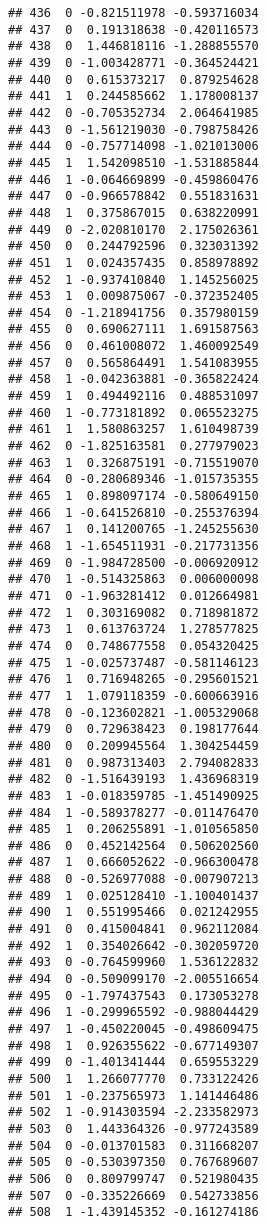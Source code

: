 \documentclass[
]{article}
\begin{document}
\begin{verbatim}
## 436  0 -0.821511978 -0.593716034
## 437  0  0.191318638 -0.420116573
## 438  0  1.446818116 -1.288855570
## 439  0 -1.003428771 -0.364524421
## 440  0  0.615373217  0.879254628
## 441  1  0.244585662  1.178008137
## 442  0 -0.705352734  2.064641985
## 443  0 -1.561219030 -0.798758426
## 444  0 -0.757714098 -1.021013006
## 445  1  1.542098510 -1.531885844
## 446  1 -0.064669899 -0.459860476
## 447  0 -0.966578842  0.551831631
## 448  1  0.375867015  0.638220991
## 449  0 -2.020810170  2.175026361
## 450  0  0.244792596  0.323031392
## 451  1  0.024357435  0.858978892
## 452  1 -0.937410840  1.145256025
## 453  1  0.009875067 -0.372352405
## 454  0 -1.218941756  0.357980159
## 455  0  0.690627111  1.691587563
## 456  0  0.461008072  1.460092549
## 457  0  0.565864491  1.541083955
## 458  1 -0.042363881 -0.365822424
## 459  1  0.494492116  0.488531097
## 460  1 -0.773181892  0.065523275
## 461  1  1.580863257  1.610498739
## 462  0 -1.825163581  0.277979023
## 463  1  0.326875191 -0.715519070
## 464  0 -0.280689346 -1.015735355
## 465  1  0.898097174 -0.580649150
## 466  1 -0.641526810 -0.255376394
## 467  1  0.141200765 -1.245255630
## 468  1 -1.654511931 -0.217731356
## 469  0 -1.984728500 -0.006920912
## 470  1 -0.514325863  0.006000098
## 471  0 -1.963281412  0.012664981
## 472  1  0.303169082  0.718981872
## 473  1  0.613763724  1.278577825
## 474  0  0.748677558  0.054320425
## 475  1 -0.025737487 -0.581146123
## 476  1  0.716948265 -0.295601521
## 477  1  1.079118359 -0.600663916
## 478  0 -0.123602821 -1.005329068
## 479  0  0.729638423  0.198177644
## 480  0  0.209945564  1.304254459
## 481  0  0.987313403  2.794082833
## 482  0 -1.516439193  1.436968319
## 483  1 -0.018359785 -1.451490925
## 484  1 -0.589378277 -0.011476470
## 485  1  0.206255891 -1.010565850
## 486  0  0.452142564  0.506202560
## 487  1  0.666052622 -0.966300478
## 488  0 -0.526977088 -0.007907213
## 489  1  0.025128410 -1.100401437
## 490  1  0.551995466  0.021242955
## 491  0  0.415004841  0.962112084
## 492  1  0.354026642 -0.302059720
## 493  0 -0.764599960  1.536122832
## 494  0 -0.509099170 -2.005516654
## 495  0 -1.797437543  0.173053278
## 496  1 -0.299965592 -0.988044429
## 497  1 -0.450220045 -0.498609475
## 498  1  0.926355622 -0.677149307
## 499  0 -1.401341444  0.659553229
## 500  1  1.266077770  0.733122426
## 501  1 -0.237565973  1.141446486
## 502  1 -0.914303594 -2.233582973
## 503  0  1.443364326 -0.977243589
## 504  0 -0.013701583  0.311668207
## 505  0 -0.530397350  0.767689607
## 506  0  0.809799747  0.521980435
## 507  0 -0.335226669  0.542733856
## 508  1 -1.439145352 -0.161274186

\end{verbatim}
\end{document}
